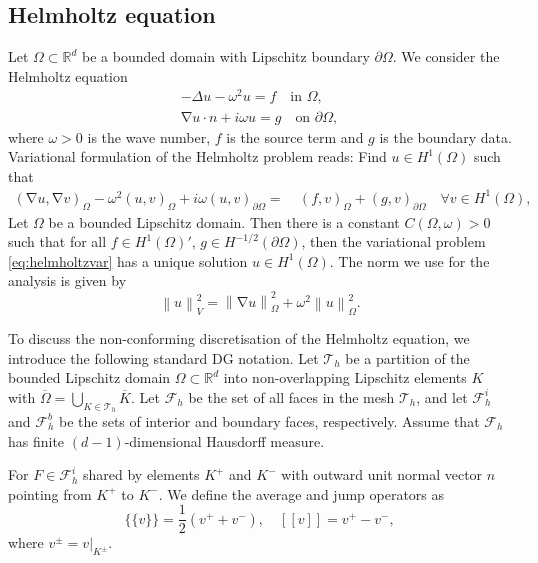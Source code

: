 \documentclass[11pt]{article}
\newenvironment{eqs} %
 { \begin{equation} \begin{aligned} } %
 { \end{aligned} \end{equation} \ignorespacesafterend } %
\theoremstyle{definition}
\theoremstyle{plain}
\newcommand{\jmp}[1]{[\![ #1 ]\!]}
\newcommand{\avg}[1]{\{\!\!\{#1\}\!\!\}}
\newcommand{\dom}{\Omega}
\newcommand{\Th}{{\calT_h}}
\newcommand{\Fh}{{\calF_h}}
\newcommand{\Fhi}{{\calF_h^i}}
\newcommand{\Fhb}{{\calF_h^b}}
\DeclareMathOperator{\grad}{\nabla}
\newcommand{\inner}[1]{( #1 )}
\newcommand*{\norm}[1]{\left\|#1\right\|}
\newcommand{\IR}{\mathbb{R}}
\newcommand{\calF}{\mathcal{F}}
\newcommand{\calT}{\mathcal{T}}
\begin{document}
\subsection{Helmholtz equation}
Let $\Omega\subset \IR^d$ be a bounded domain with Lipschitz boundary $\partial\Omega$.
We consider the Helmholtz equation
\begin{eqs}\label{eq:helmholtz}
    -\Delta u - \omega^2 u = f \quad \text{in } \Omega,\\
    \grad u \cdot n + i\omega u = g \quad \text{on } \partial\Omega, 
\end{eqs}
where $\omega>0$ is the wave number, $f$ is the source term and $g$ is the boundary data.
Variational formulation of the Helmholtz problem reads: Find $u\in H^1(\Omega)$ such that
\begin{eqs}\label{eq:helmholtzvar}
    \inner{\grad u, \grad v}_\Omega - \omega^2 \inner{u, v}_\Omega + i\omega\inner{u,v}_{\partial\Omega}
    =&\ \inner{f, v}_\Omega + \inner{g, v}_{\partial\Omega}\quad \forall v\in H^1(\Omega),
\end{eqs}
Let $\dom$ be a bounded Lipschitz domain. Then there is a constant $C(\dom,\omega)>0$ such that for all $f\in H^1(\dom)'$, $g\in H^{-1/2}(\partial\dom)$, then the variational problem \eqref{eq:helmholtzvar} has a unique solution $u\in H^1(\dom)$.
The norm we use for the analysis is given by
\[ \norm{u}_V^2 = \norm{\grad u}^2_\Omega + \omega^2\norm{u}^2_\Omega. \]

To discuss the non-conforming discretisation of the Helmholtz equation, we introduce the following standard DG notation. 
Let $\mathcal T_h$ be a partition of the bounded Lipschitz domain $\Omega\subset\mathbb{R}^d$ into non-overlapping Lipschitz elements $K$ with $\overline\Omega=\bigcup_{K\in\mathcal T_h}\overline K$.
Let $\Fh$ be the set of all faces in the mesh $\Th$, and let $\Fhi$ and $\Fhb$ be the sets of interior and boundary faces, respectively. Assume that $\Fh$ has finite $(d-1)$-dimensional Hausdorff measure.


For $F\in\Fhi$ shared by elements $K^+$ and $K^-$ with outward unit normal vector $n$ pointing from $K^+$ to $K^-$. 
We define the average and jump operators as
\begin{equation*}
    \avg{v} = \frac{1}{2}(v^+ + v^-), \quad \jmp{v} = v^+ - v^-,
\end{equation*}
where $v^\pm = v|_{K^\pm}$.
\end{document}
